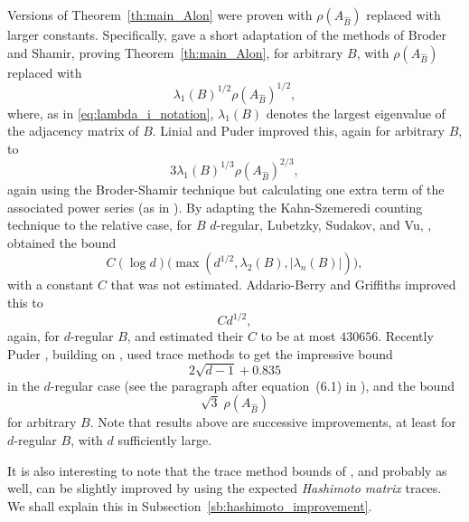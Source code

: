 \documentclass{memo-l}
\theoremstyle{plain}
\theoremstyle{definition}
\numberwithin{section}{chapter}
\numberwithin{equation}{chapter}
\theoremstyle{plain}
\theoremstyle{definition}
\begin{document}
Versions of Theorem~\ref{th:main_Alon} were proven with 
$\rho(A_{\widehat B})$ replaced with larger constants.
Specifically, \cite{friedman_relative} gave a short adaptation of
the methods of Broder and Shamir, proving
Theorem~\ref{th:main_Alon},
for arbitrary $B$, with $\rho(A_{\widehat B})$ replaced with
\begin{equation}\label{eq:geometric_mean}
\lambda_1(B)^{1/2}\rho(A_{\widehat B})^{1/2} ,
\end{equation}
where,
as in \eqref{eq:lambda_i_notation},
$\lambda_1(B)$ denotes the largest eigenvalue of the adjacency matrix
of $B$.
Linial and Puder \cite{linial_puder}
improved this, again for arbitrary $B$, to
$$
3 \lambda_1(B)^{1/3}\rho(A_{\widehat B})^{2/3} ,
$$
again using the Broder-Shamir technique but calculating one extra
term of the associated power series (as in \cite{friedman_random_graphs,
friedman_alon}).
By adapting the Kahn-Szemeredi counting technique to the relative case,
for $B$ $d$-regular,
Lubetzky, Sudakov, and Vu, \cite{lubetzky}, obtained the bound
$$
C (\log d) \bigl( \max(d^{1/2},\lambda_2(B),|\lambda_n(B)|)\bigr),
$$
with a constant $C$ that was not estimated.
Addario-Berry and Griffiths \cite{a-b} improved this to
$$
C d^{1/2},
$$
again, for $d$-regular $B$,
and estimated their $C$ to be at most $430656$.
Recently Puder \cite{puder}, building on
\cite{puder_prev,puder_p},
used trace methods to get the impressive bound
$$
2\sqrt{d-1} + 0.835
$$
in the $d$-regular case (see the paragraph after equation~(6.1) in
\cite{puder}), and the bound
$$
\sqrt{3}\; \rho(A_{\widehat B})
$$
for arbitrary $B$. 
Note that results above are successive improvements, at least for $d$-regular
$B$, with $d$
sufficiently large.

It is also interesting to note that the trace method bounds of
\cite{broder,friedman_random_graphs,friedman_relative,linial_puder},
and probably \cite{puder} as well, can be slightly improved by using
the expected {\em \gls{Hashimoto matrix}} traces.  We shall explain this
in Subsection~\ref{sb:hashimoto_improvement}.

\end{document}
